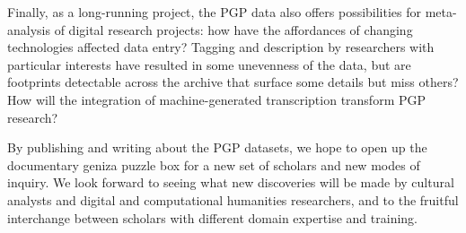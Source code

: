 \documentclass{article}
\begin{document}
Finally, as a long-running project, the PGP data also offers possibilities for meta-analysis of digital research projects: how have the affordances of changing technologies affected data entry? Tagging and description by researchers with particular interests have resulted in some unevenness of the data, but are footprints detectable across the archive that surface some details but miss others? How will the integration of machine-generated transcription transform PGP research?

By publishing and writing about the PGP datasets, we hope to open up the documentary geniza puzzle box for a new set of scholars and new modes of inquiry. We look forward to seeing what new discoveries will be made by cultural analysts and digital and computational humanities researchers, and to the fruitful interchange between scholars with different domain expertise and training.

\pagebreak
{}

\printbibliography[prenote={preamble}]
\end{document}
